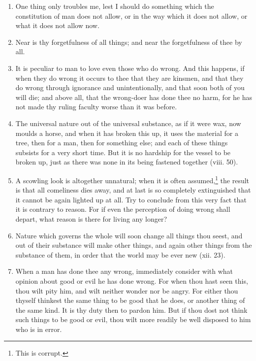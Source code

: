\begin{enumerate}
\item One thing only troubles me, lest I should do something which the constitution of man does not allow, or in the way which it does not allow, or what it does not allow now.

\item Near is thy forgetfulness of all things; and near the forgetfulness of thee by all.

\item It is peculiar to man to love even those who do wrong. And this happens, if when they do wrong it occurs to thee that they are kinsmen, and that they do wrong through ignorance and unintentionally, and that soon both of you will die; and above all, that the wrong-doer has done thee no harm, for he has not made thy ruling faculty worse than it was before.

\item The universal nature out of the universal substance, as if it were wax, now moulds a horse, and when it has broken this up, it uses the material for a tree, then for a man, then for something else; and each of these things subsists for a very short time. But it is no hardship for the vessel to be broken up, just as there was none in its being fastened together (viii. 50).

\item A scowling look is altogether unnatural; when it is often assumed,\footnote{This is corrupt.} the result is that all comeliness dies away, and at last is so completely extinguished that it cannot be again lighted up at all. Try to conclude from this very fact that it is contrary to reason. For if even the perception of doing wrong shall depart, what reason is there for living any longer?

\item Nature which governs the whole will soon change all things thou seest, and out of their substance will make other things, and again other things from the substance of them, in order that the world may be ever new (xii. 23).

\item When a man has done thee any wrong, immediately consider with what opinion about good or evil he has done wrong. For when thou hast seen this, thou wilt pity him, and wilt neither wonder nor be angry. For either thou thyself thinkest the same thing to be good that he does, or another thing of the same kind. It is thy duty then to pardon him. But if thou dost not think such things to be good or evil, thou wilt more readily be well disposed to him who is in error.


\end{enumerate}
